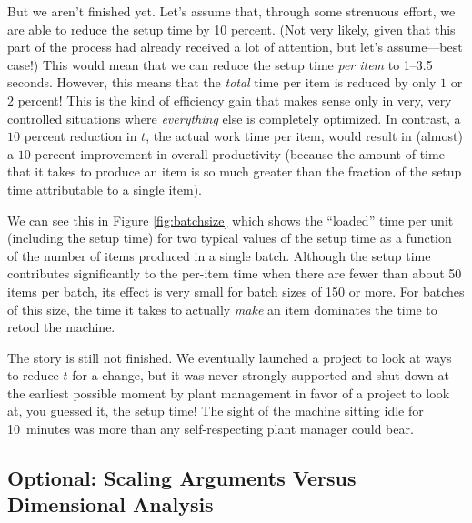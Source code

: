 But we aren't finished yet. Let's assume that, through some strenuous
effort, we are able to reduce the setup time by 10 percent. (Not very
likely, given that this part of the process had already received a lot
of attention, but let's assume---best case!) This would mean that we
can reduce the setup time \emph{per item} to 1--3.5 seconds. However,
this means that the \emph{total} time per\vadjust{\pagebreak} item is reduced by only $1$
or $2$ percent! This is the kind of efficiency gain that makes sense
only in very, very controlled situations where \emph{everything} else
is completely optimized. In contrast, a $10$ percent reduction in $t$,
the actual work time per item, would result in (almost) a $10$ percent
improvement in overall productivity (because the amount of time that
it takes to produce an item is so much greater than the fraction of
the setup time attributable to a single item).

We can see this in Figure \ref{fig:batchsize} which shows the
``loaded'' time per unit (including the setup time) for two typical
values of the setup time as a function of the number of items produced
in a single batch.  Although the setup time contributes significantly
to the per-item time when there are fewer than about 50 items per
batch, its effect is very small for batch sizes of 150 or more. For
batches of this size, the time it takes to actually \emph{make} an
item dominates the time to retool the machine.

The story is still not finished. We eventually launched a project to
look at ways to reduce $t$ for a change, but it was never strongly
supported and shut down at the earliest possible moment by plant
management in favor of a project to look at, you guessed it, the setup
time! The sight of the machine sitting idle for 10~minutes was more
than any self-respecting plant manager could bear.





\subsection{Optional: Scaling Arguments Versus Dimensional Analysis}

